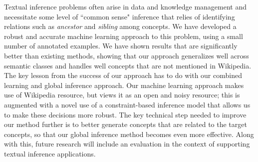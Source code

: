 Textual inference problems often arise in data and knowledge
management and necessitate some level of ``common sense" inference
that relies of identifying relations such as {\em ancestor} and {\em
sibling} among concepts.  We have developed a robust and accurate
machine learning approach to this problem, using a small number of
annotated examples. We have shown results that are significantly
better than existing methods, showing that our approach generalizes
well across semantic classes and handles well concepts that are not
mentioned in Wikipedia.  The key lesson from the success of our
approach has to do with our combined learning and global inference
approach. Our machine learning approach makes use of Wikipedia
resource, but views it as an open and noisy resource; this is
augmented with a novel use of a constraint-based inference model that
allows us to make these decisions more robust.  The key technical step
needed to improve our method further is to better generate concepts
that are related to the target concepts, so that our global inference
method becomes even more effective. Along with this, future research
will include an evaluation in the context of supporting textual
inference applications.

